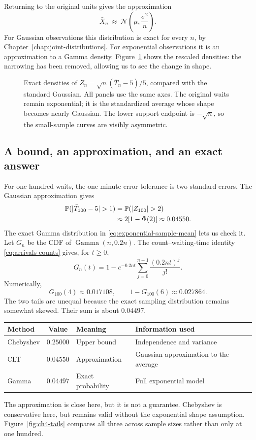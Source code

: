 Returning to the original units gives the approximation
\[
  \bar X_n\ \approx\ \mathcal N\!\left(\mu,\frac{\sigma^2}{n}\right).
\]
For Gaussian observations this distribution is exact for every \(n\),
by Chapter~\ref{chap:joint-distributions}. For exponential observations
it is an approximation to a Gamma density. Figure~\ref{fig:ch4-clt}
shows the rescaled densities: the narrowing has been removed, allowing
us to see the change in shape.

\begin{figure}[H]
  \centering
  
  \caption{Exact densities of
  \(Z_n=\sqrt n(\bar T_n-5)/5\), compared with the standard Gaussian.
  All panels use the same axes. The original waits remain exponential;
  it is the standardized average whose shape becomes nearly Gaussian.
  The lower support endpoint is \(-\sqrt n\), so the small-sample
  curves are visibly asymmetric.}
  \label{fig:ch4-clt}
\end{figure}

\subsection{A bound, an approximation, and an exact answer}

For one hundred waits, the one-minute error tolerance is two standard
errors. The Gaussian approximation gives
\begin{align*}
  \Prob(|\bar T_{100}-5|>1)
  &=\Prob(|Z_{100}|>2)\\
  &\approx 2[1-\Phi(2)]\approx0.04550.
\end{align*}
The exact Gamma distribution in \eqref{eq:exponential-sample-mean}
lets us check it. Let \(G_n\) be the CDF of
\(\operatorname{Gamma}(n,0.2n)\). The count--waiting-time identity
\eqref{eq:arrivals-counts} gives, for \(t\ge0\),
\[
  G_n(t)=1-e^{-0.2nt}\sum_{j=0}^{n-1}\frac{(0.2nt)^j}{j!}.
\]
Numerically,
\[
  G_{100}(4)\approx0.017108,
  \qquad 1-G_{100}(6)\approx0.027864.
\]
The two tails are unequal because the exact sampling distribution
remains somewhat skewed. Their sum is about \(0.04497\).

\begin{center}
\begin{tabularx}{\textwidth}{@{}lclY@{}}
\toprule
Method & Value & Meaning & Information used\\
\midrule
Chebyshev & \(0.25000\) & Upper bound & Independence and variance\\
CLT & \(0.04550\) & Approximation & Gaussian approximation to the average\\
Gamma & \(0.04497\) & Exact probability & Full exponential model\\
\bottomrule
\end{tabularx}
\end{center}
The approximation is close here, but it is not a guarantee. Chebyshev
is conservative here, but remains valid without the exponential shape
assumption. Figure~\ref{fig:ch4-tails} compares all three across sample
sizes rather than only at one hundred.

